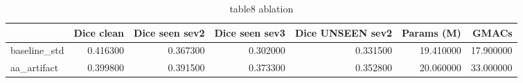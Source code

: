 \begin{table}
\caption{table8 ablation}
\label{tab:table8_ablation}
\begin{tabular}{lrrrrrr}
\toprule
 & Dice clean & Dice seen sev2 & Dice seen sev3 & Dice UNSEEN sev2 & Params (M) & GMACs \\
\midrule
baseline\_std & 0.416300 & 0.367300 & 0.302000 & 0.331500 & 19.410000 & 17.900000 \\
aa\_artifact & 0.399800 & 0.391500 & 0.373300 & 0.352800 & 20.060000 & 33.000000 \\
\bottomrule
\end{tabular}
\end{table}
